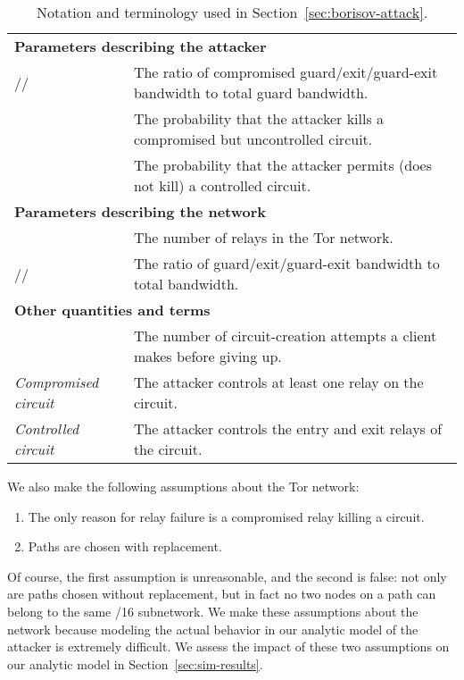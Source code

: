 \documentclass[]{lmcs}
\begin{document}
\begin{table}
\begin{tabular}{p{}p{}}
\multicolumn{2}{l}{\textbf{Parameters describing the attacker}} \\
//			& The ratio of compromised guard/exit/guard-exit
					  bandwidth to total guard bandwidth. \\
			& The probability that the attacker kills a compromised
					  but uncontrolled circuit. \\
		& The probability that the attacker permits (does
					  not kill) a controlled circuit. \\
\multicolumn{2}{l}{\textbf{Parameters describing the network}} \\
					& The number of relays in the Tor network. \\
//		& The ratio of guard/exit/guard-exit
					  bandwidth to total bandwidth. \\
\multicolumn{2}{l}{\textbf{Other quantities and terms}} \\
					& The number of circuit-creation attempts a client makes 
					  before giving up. \\
\textit{Compromised circuit} 	& The attacker controls at least one relay
								  on the circuit. \\
\textit{Controlled circuit}		& The attacker controls the entry and exit
								  relays of the circuit.
\end{tabular}
\caption{Notation and terminology used in Section~\ref{sec:borisov-attack}.}
\end{table}

We also make the following assumptions about the Tor network:
\begin{enumerate}
\item The only reason for relay failure is a compromised relay
killing a circuit.
\item Paths are chosen with replacement.
\end{enumerate}
Of course, the first assumption is unreasonable, and the second
is false:  not only are paths chosen without replacement,
but in fact no two nodes on a path can belong to the same /16 subnetwork.
We make these assumptions about the network because modeling the
actual behavior in our analytic model of the attacker is extremely
difficult.  We assess the impact of these two assumptions on our
analytic model in Section~\ref{sec:sim-results}.
\end{document}

